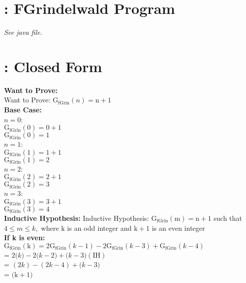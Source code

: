 \documentclass{article}
\begin{document}
    \section{: FGrindelwald Program} \textit{See java file.}
    \section{: Closed Form}
    \textbf{Want to Prove:}
    \\\indent\indent Want to Prove: $\mathrm{G}_{\text{fGrin}}(n)=\mathrm{n}+1$
    \\\textbf{Base Case:}
    \\\indent\indent$n=0$:
    \\\indent\indent\indent\indent$\mathrm{G}_{\mathrm{fGrin}}(0)=0+1$
    \\\indent\indent\indent\indent$\mathrm{G}_{\mathrm{fGrin}}(0)=1$
    \\\indent\indent$n=1$:
    \\\indent\indent\indent\indent$\mathrm{G}_{\mathrm{fGrin}}(1)=1+1$
    \\\indent\indent\indent\indent$\mathrm{G}_{\mathrm{fGrin}}(1)=2$
    \\\indent\indent$n=2$:
    \\\indent\indent\indent\indent$\mathrm{G}_{\mathrm{fGrin}}(2)=2+1$
    \\\indent\indent\indent\indent$\mathrm{G}_{\mathrm{fGrin}}(2)=3$
    \\\indent\indent$n=3$:
    \\\indent\indent\indent\indent$\mathrm{G}_{\mathrm{fGrin}}(3)=3+1$
    \\\indent\indent\indent\indent$\mathrm{G}_{\mathrm{fGrin}}(3)=4$
    \\\textbf{Inductive Hypothesis:}
    Inductive Hypothesis: $\mathrm{G}_{\mathrm{fG} \text {rin}}(\mathrm{m})=\mathrm{n}+1$ such that $4 \leq m \leq k,$ where $\mathrm{k}$ is an odd integer and $\mathrm{k}+1$ is an even integer    \\\textbf{If k is even:}
    \\\indent\indent$\mathrm{G}_{\text{fGrin}}(\mathrm{k})=2 \mathrm{G}_{\text{fGrin}}(k-1)-2 \mathrm{G}_{\text{fGrin}}(k-3)+\mathrm{G}_{\text{fGrin}}(k-4)$
    \\\indent\indent\indent\indent\indent= $2 \mathrm(k)-2 \mathrm(k-2)+\mathrm(k-3)(\mathrm{IH})$
    \\\indent\indent\indent\indent\indent= $(2 k)-(2 k-4)+\mathrm(k-3)$
    \\\indent\indent\indent\indent\indent= $\mathrm(\mathrm{k}+1)$
\end{document}
